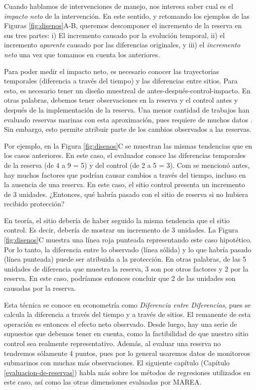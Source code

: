 \documentclass[]{krantz}
\begin{document}
Cuando hablamos de intervenciones de manejo, nos interesa saber cual es
el \emph{impacto neto} de la intervención. En este sentido, y retomando
los ejemplos de las Figuras \ref{fig:disenos}A-B, queremos descomponer
el incremento de la reserva en sus tres partes: i) El incremento causado
por la evolución temporal, ii) el incremento \emph{aparente} causado por
las diferencias originales, y iii) el \emph{incremento neto} una vez que
tomamos en cuenta los anteriores.

Para poder medir el impacto neto, es necesario conocer las trayectorias
temporales (diferencia a través del tiempo) y las diferencias entre
sitios. Para esto, es necesario tener un diseño muestreal de
antes-después-control-impacto. En otras palabras, debemos tener
observaciones en la reserva y el control antes y después de la
implementación de la reserva. Una menor cantidad de trabajos han
evaluado reservas marinas con esta aproximación, pues requiere de muchos
datos \citep{moland_2013, villasenorderbez_2018}. Sin embargo, esto
permite atribuir parte de los cambios observados a las reservas.

Por ejemplo, en la Figura \ref{fig:disenos}C se muestran las mismas
tendencias que en los casos anteriores. En este caso, el evaluador
conoce las diferencias temporales de la reserva (de 4 a 9 = 5) y del
control (de 2 a 5 = 3). Com se mencionó antes, hay muchos factores que
podrían causar cambios a través del tiempo, incluso en la ausencia de
una reserva. En este caso, el sitio control presenta un incremento de 3
unidades. ¿Entonces, qué habría pasado con el sitio de reserva si no
hubiera recibido protección?

En teoría, el sitio debería de haber seguido la misma tendencia que el
sitio control. Es decir, debería de mostrar un incremento de 3 unidades.
La Figura \ref{fig:disenos}C muestra una línea roja punteada
representando este caso hipotético. Por lo tanto, la diferencia entre lo
observado (línea sólida) y lo que habría pasado (línea punteada) puede
ser atribuida a la protección. En otras palabras, de las 5 unidades de
diferencia que muestra la reserva, 3 son por otros factores y 2 por la
reserva. En este caso, podríamos entonces concluir que 2 de las unidades
son causadas por la reserva.

Esta técnica se conoce en econometría como \emph{Diferencia entre
Diferencias}, pues se calcula la diferencia a través del tiempo y a
través de sitios. El remanente de esta operación es entonces el efecto
neto observado. Desde luego, hay una serie de supuestos que debemos
tener en cuenta, como la factibilidad de que nuestro sitio control sea
realmente representativo. Además, al evaluar una reserva no tendremos
sólamente 4 puntos, pues por lo general usaremos datos de monitoreos
submarinos con muchas más observaciones. El siguiente capítulo (Capítulo
\ref{evaluacion-de-reservas}) habla más sobre los métodos de regresiones
utilizados en este caso, así como las otras dimensiones evaluadas por
MAREA.
\end{document}

